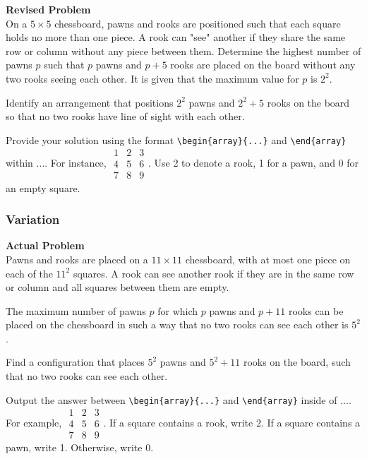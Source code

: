 \textbf{Revised Problem}\\
On a $5 \times 5$ chessboard, pawns and rooks are positioned such that each square holds no more than one piece. A rook can "see" another if they share the same row or column without any piece between them. Determine the highest number of pawns $p$ such that $p$ pawns and $p + 5$ rooks are placed on the board without any two rooks seeing each other. It is given that the maximum value for $p$ is $2^2$.

Identify an arrangement that positions $2^2$ pawns and $2^2 + 5$ rooks on the board so that no two rooks have line of sight with each other.

Provide your solution using the format \verb|\begin{array}{...}| and \verb|\end{array}| within $\boxed{...}$. For instance, $\boxed{\begin{array}{ccc}1 & 2 & 3 \\ 4 & 5 & 6 \\ 7 & 8 & 9\end{array}}$. Use 2 to denote a rook, 1 for a pawn, and 0 for an empty square.

\subsubsection{Variation}
\textbf{Actual Problem}\\
Pawns and rooks are placed on a $11 \times 11$ chessboard, with at most one piece on each of the $11^2$ squares. A rook can see another rook if they are in the same row or column and all squares between them are empty. 

The maximum number of pawns $p$ for which $p$ pawns and $p + 11$ rooks can be placed on the chessboard in such a way that no two rooks can see each other is $5^2$. 

Find a configuration that places $5^2$ pawns and $5^2 + 11$ rooks on the board, such that no two rooks can see each other.

Output the answer between \verb|\begin{array}{...}| and \verb|\end{array}| inside of $\boxed{...}$. For example, $\boxed{\begin{array}{ccc}1 & 2 & 3 \\ 4 & 5 & 6 \\ 7 & 8 & 9\end{array}}$.
If a square contains a rook, write 2. If a square contains a pawn, write 1. Otherwise, write 0.

